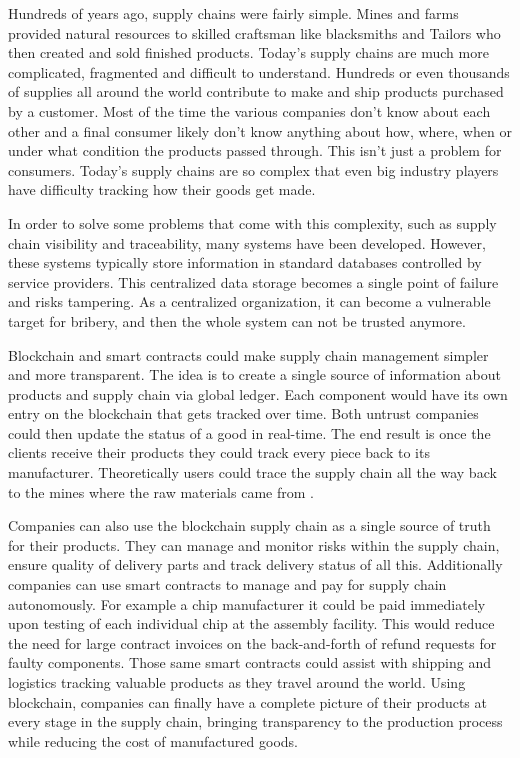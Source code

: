 
\acresetall 

Hundreds of years ago, supply chains were fairly simple. Mines and farms provided natural resources to skilled craftsman like blacksmiths and Tailors who then created and sold finished products. Today's supply chains are much more complicated, fragmented and difficult to understand. Hundreds or even thousands of supplies all around the world contribute to make and ship products purchased by a customer. Most of the time the various companies don't know about each other and a final consumer likely don't know anything about how, where, when or under what condition the products passed through. This isn't just a problem for consumers. Today's supply chains are so complex that even big industry players have difficulty tracking how their goods get made.


In order to solve some problems that come with this complexity, such as supply chain visibility and traceability, many systems have been developed. However, these systems typically store information in standard databases controlled by service providers. This centralized data storage becomes a single point of failure and risks tampering. As a centralized organization, it can become a vulnerable target for bribery, and then the whole system can not be trusted anymore.

Blockchain and smart contracts could make supply chain management simpler and more transparent. The idea is to create a single source of information about products and supply chain via global ledger. Each component would have its own entry on the blockchain that gets tracked over time. Both untrust companies could then update the status of a good in real-time. The end result is once the clients receive their products they could track every piece back to its manufacturer. Theoretically users could trace the supply chain all the way back to the mines where the raw materials came from \cite{greve2018blockchain}.

Companies can also use the blockchain supply chain as a single source of truth for their products. They can manage and monitor risks within the supply chain, ensure quality of delivery parts and track delivery status of all this. Additionally companies can use smart contracts to manage and pay for supply chain autonomously. For example a chip manufacturer it could be paid immediately upon testing of each individual chip at the assembly facility. This would reduce the need for large contract invoices on the back-and-forth of refund requests for faulty components. Those same smart contracts could assist with shipping and logistics tracking valuable products as they travel around the world. Using blockchain, companies can finally have a complete picture of their products at every stage in the supply chain, bringing transparency to the production process while reducing the cost of manufactured goods.


